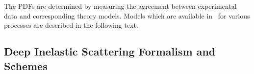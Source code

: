 
\def\kt{\ensuremath{k_t}}
\newcommand{\Pmax}{p}
\newcommand{\CCFM}{CCFMa,CCFMb,Catani:1989sg,CCFMd}


%
The PDFs are determined by measuring 
the agreement between experimental data and corresponding theory models. 
Models which are available in \fitter\ for various processes are described in the following text.


\subsection{Deep Inelastic Scattering Formalism and Schemes}


